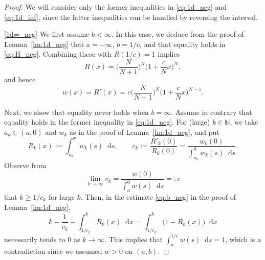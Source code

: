 \documentclass[sts]{imsart}
\theoremstyle{definition}
\theoremstyle{remark}
\newcommand{\N}{\mathbb{N}}
\newcommand*\diff{\mathop{}\!\mathrm{d}}
\begin{document}
\begin{proof}
We will consider only the former inequalities in \eqref{eq:1d_neg} and \eqref{eq:1d_inf},
since the latter inequalities can be handled by reversing the interval.

\eqref{1d=_neg}
We first assume $b<\infty$.
In this case, we deduce from the proof of Lemma~\ref{lm:1d_neg} that $a=-\infty$, $b=1/c$, and that equality holds in \eqref{eq:H_neg}.
Combining these with $R(1/c)=1$ implies
\[ R(x) =\biggl( \frac{N}{N+1} \biggr)^N \biggl( 1+\frac{c}{N}x \biggr)^N, \]
and hence
\[ w(x) =R'(x) =c \biggl( \frac{N}{N+1} \biggr)^N \biggl( 1+\frac{c}{N}x \biggr)^{N-1}. \]

Next, we show that equality never holds when $b=\infty$.
Assume in contrary that equality holds in the former inequality in \eqref{eq:1d_neg}.
For (large) $k \in \N$, we take $a_k \in (a,0)$ and $w_k$ as in the proof of Lemma~\ref{lm:1d_neg}, and put
\[ R_k(x) :=\int_{a_k}^x w_k(s) \diff s, \qquad
 c_k:=\frac{R'_k(0)}{R_k(0)} =\frac{w_k(0)}{\int_{a_k}^0 w_k(s) \diff s}. \]
Observe from
\[ \lim_{k \to \infty} c_k = \frac{w(0)}{\int_a^0 w(s) \diff s} =:c \]
that $k \ge 1/c_k$ for large $k$.
Then, in the estimate \eqref{eq:b_neg} in the proof of Lemma~\ref{lm:1d_neg},
\[ k-\frac{1}{c_k} -\int_{1/c_k}^k R_k(x) \diff x =\int_{1/c_k}^k \bigl( 1-R_k(x) \bigr) \diff x \]
necessarily tends to $0$ as $k \to \infty$.
This implies that $\int_a^{1/c} w(s) \diff s =1$,
which is a contradiction since we assumed $w>0$ on $(a,b)$.


\end{proof}
\end{document}

